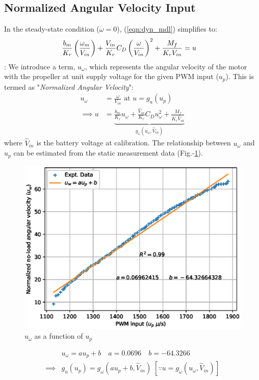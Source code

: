 \subsection{Normalized Angular Velocity Input}
In the steady-state condition ($\dot \omega = 0$), (\ref{eqn:dyn_mdl}) simplifies to:
\begin{align}
    &\frac{b_m}{K_r} \left(\frac{\omega_m}{V_{in}}\right) + \frac{V_{in}}{K_r} C_D \left( \frac{\omega}{V_{in}} \right)^2 + \frac{M_f}{K_r V_{in}} = u
\end{align}
: We introduce a term, $u_{\omega}$, which represents the angular velocity of the motor with the propeller at unit supply voltage for the given PWM input ($u_p$). This is termed as "\textit{Normalized Angular Velocity}":
\begin{align}
    u_{\omega} &= \frac{\omega}{V_{in}} \text{  at  } u = g_u(u_p) \\
    \implies u &= \underbrace{\frac{b_m}{K_r} u_\omega + \frac{\hat V_{in}}{K_r} C_D u_\omega^2 + \frac{M_f}{K_r  \hat V_{in}}}_{g_\omega (u_\omega, \hat V_{in})}
     \label{eqn::input_def}
\end{align}
where $\hat V_{in}$ is the battery voltage at calibration.
The relationship between $u_\omega$ and $u_p$ can be estimated from the static
measurement data (Fig.-\ref{fig::norm_omega}).
\begin{figure}[h]
    \centering
    \includegraphics[width = \figsize]{./figs/figs_acc/norm_omega/no-load_rpm.eps}
    \caption{$u_\omega$ as a function of $u_p$}
    \label{fig::norm_omega}
\end{figure}
\begin{align}
    &u_\omega = a u_p + b
    \quad a = 0.0696
    \quad b = -64.3266\\
    \implies& g_u(u_p) = g_\omega(a u_p  + b, \hat V_{in})
    \; [\because u = g_\omega(u_\omega, \hat V_{in})]
\end{align}
